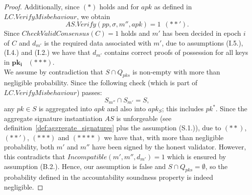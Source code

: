 \begin{proof}
\noindent Additionally, since $(\ast)$ holds and for $\mathit{apk}$ as defined in $\mathit{LC.VerifyMisbehaviour}$, we obtain
$$\mathit{AS.Verify}(\mathit{pp}, \sigma, m'', \mathit{apk}) = 1 \ \ (\ast \ast').$$
\noindent Since $\mathit{CheckValidConsensus}(C) = 1$ holds and $m'$ has been decided in epoch $i$ of $C$ 
and $d_{m'}$ is the required data associated with $m'$, due to assumptions (I.5.), (I.4.) and (I.2.) we have 
that $d_{m'}$ contains correct proofs of possession for all keys in $\mathbf{pk_i}$ \ $(\ast\ast\ast)$. \\ 
\noindent We assume by contradiction that $S \cap Q_{\mathit{pks}}$ is non-empty with more than negligible probability. 
Since the following check (which is part of $\mathit{LC.VerifyMisbehaviour}$) passes:  
$$S_{m''} \cap S_{m'} =S,$$ any $\mathit{pk} \in S$ is aggregated into $\mathit{apk}$ and also into $\mathit{apk_S}$; 
this includes $\mathit{pk^*}$. Since the aggregate signature instantiation $\mathit{AS}$ is unforgeable 
(see definition~\ref{def:aggregate_signatures} plus the assumption (S.1.)), due to $(\ast\ast)$, $(\ast\ast')$, $(\ast\ast\ast)$ and 
$(\ast\ast\ast\ast)$ we have that, with more than negligible probability, both $m'$ and $m''$ have 
been signed by the honest validator. However, this contradicts that 
$\mathit{Incompatible}(m', m'', d_{m'}) = 1$ which is ensured by assumption (B.2.). Hence, our assumption is false and $S \cap \mathit{Q_{pks}} = \emptyset$, so the 
probability defined in the accountability soundness property is indeed negligible. 

\end{proof}

